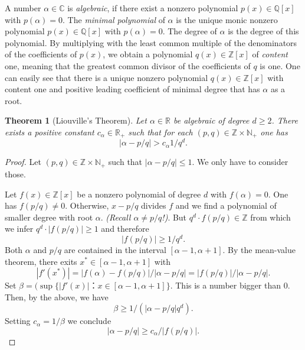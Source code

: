 \documentclass[a4paper,11pt,american]{article}
\theoremstyle{plain}
\newtheorem{theorem}{Theorem}
\theoremstyle{definition}
\begin{document}
Α number $α ∈ℂ$ is \emph{algebraic}, if there exist a nonzero polynomial $p(x) ∈ ℚ[x]$ with $p(α) = 0$. The \emph{minimal polynomial} of $α$ is the unique monic nonzero polynomial $p(x) ∈ℚ[x]$ with $p(α) = 0$. The degree of $α$ is the degree of this polynomial.  By multiplying with the least common multiple of the denominators of the coefficients of $p(x)$, we obtain a polynomial $q(x) ∈ℤ[x]$ of \emph{content} one, meaning that the greatest common divisor of the coefficients of $q$ is one. One can easily see that there is a unique nonzero polynomial $q(x) ∈ℤ[x]$ with content one and positive leading coefficient of minimal degree that has $α$ as a root.

\begin{theorem}[Liouville's Theorem]
  \label{thr:5}
  Let $α∈ℝ$ be algebraic of degree $d≥2$. There exists a positive constant $c_α ∈ ℝ_+$ such that for each $(p,q) ∈ ℤ × ℕ_+$ one has
  \begin{displaymath}
    | α - p/q | > c_α 1/q^d. 
  \end{displaymath}
\end{theorem}

\begin{proof}
  Let $(p,q) ∈ ℤ ×ℕ_+$ such that  $| α - p/q | ≤1$. We only have to consider those. 

  Let $f(x) ∈ ℤ[x]$ be a nonzero polynomial of degree $d$ with $f(α) = 0$.  One has $f(p/q) ≠ 0$. Otherwise, $x- p/q$ divides $f$ and we find a polynomial of smaller degree with root $α$. \emph{(Recall $α ≠ p/q$!)}.  But $q^d ⋅ f(p/q) ∈ℤ$ from which we infer $q^d ⋅ |f(p/q)| ≥1$ and therefore 
  \begin{displaymath}
     |f(p/q)| ≥1 / q^d. 
   \end{displaymath}
   Both $α$ and $p/q$ are contained in the interval $[α -1, α+1]$. 
  By the mean-value theorem, there exits $x^* ∈ [α -1, α+1]$ with
  \begin{displaymath}
    |f'(x^*)| = |f(α) - f(p/q)| / |α - p/q| = |f(p/q)| / |α - p/q| . 
  \end{displaymath}
  Set $β = (\sup\{ |f'(x)| ： x ∈ [α-1 ,α+1]\}$. This is a number bigger than $0$.   Then, by the above, we have 
  \begin{displaymath}
    β ≥ 1/ ( |α - p/q| q^d). 
  \end{displaymath}
  Setting $c_α = 1/ β$ we conclude 
  \begin{displaymath}
    |α - p/q| ≥ c_α / |f(p/q)|. 
  \end{displaymath}
\end{proof}



\end{document}
